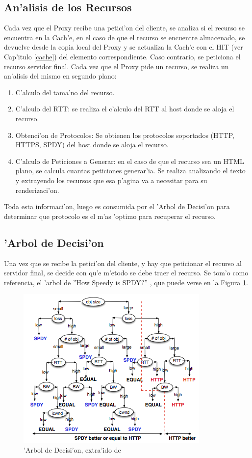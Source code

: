\subsection{An'alisis de los Recursos}
\label{analisisRecurso}
Cada vez que el Proxy recibe una petici'on del cliente, se analiza si el recurso se encuentra en la Cach'e, en el caso de que el recurso se encuentre almacenado, se devuelve desde la copia local del Proxy y se actualiza la Cach'e con el HIT (ver Cap'itulo \ref{cache}) del elemento correspondiente. Caso contrario, se peticiona el recurso servidor final.
Cada vez que el Proxy pide un recurso, se realiza un an'alisis del mismo en segundo plano:
\begin{enumerate}
\item C'alculo del tama'no del recurso.
\item C'alculo del RTT: se realiza el c'alculo del RTT al host donde se aloja el recurso.
\item Obtenci'on de Protocolos: Se obtienen los protocolos soportados (HTTP, HTTPS, SPDY) del host donde se aloja el recurso.
\item C'alculo de Peticiones a Generar: en el caso de que el recurso sea un HTML plano, se calcula cuantas peticiones generar'ia. Se realiza analizando el texto y extrayendo los recursos que esa p'agina va a necesitar para su renderizaci'on.
\end{enumerate}
Toda esta informaci'on, luego es consumida por el 'Arbol de Decisi'on para determinar que protocolo es el m'as 'optimo para recuperar el recurso.

\subsection{'Arbol de Decisi'on}

Una vez que se recibe la petici'on del cliente, y hay que peticionar el recurso al servidor final, se decide con qu'e m'etodo se debe traer el recurso. Se tom'o como referencia, el 'arbol de ''How Speedy is SPDY?'' \citep{howSpeedy}, que puede verse en la Figura \ref{arbolDecision}.

\begin{figure}[h]
  	\centering
	\includegraphics{img/arbolDecision}
	\caption{\small 'Arbol de Decisi'on, extra'ido de \citep{howSpeedy}}
	\label{arbolDecision}
\end{figure}

